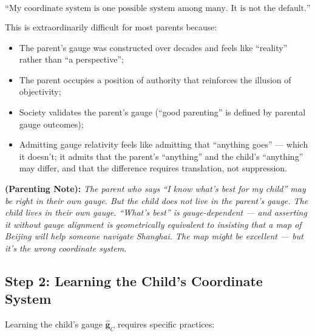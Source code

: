 \documentclass[11pt,a4paper]{article}
\newcommand{\parentnote}[1]{%
  \medskip\noindent
  \textbf{ (Parenting Note):} \textit{#1}%
}
\begin{document}
\begin{equation}
    \text{``My coordinate system is one possible system among many. It is not the default.''}
\end{equation}

This is extraordinarily difficult for most parents because:
\begin{itemize}
    \item The parent's gauge was constructed over decades and feels like ``reality'' rather than ``a perspective'';
    \item The parent occupies a position of authority that reinforces the illusion of objectivity;
    \item Society validates the parent's gauge (``good parenting'' is defined by parental gauge outcomes);
    \item Admitting gauge relativity feels like admitting that ``anything goes'' — which it doesn't; it admits that the parent's ``anything'' and the child's ``anything'' may differ, and that the difference requires translation, not suppression.
\end{itemize}

\parentnote{The parent who says ``I know what's best for my child'' may be right in their own gauge. But the child does not live in the parent's gauge. The child lives in their own gauge. ``What's best'' is gauge-dependent — and asserting it without gauge alignment is geometrically equivalent to insisting that a map of Beijing will help someone navigate Shanghai. The map might be excellent — but it's the wrong coordinate system.}

\subsection{Step 2: Learning the Child's Coordinate System}

Learning the child's gauge $\hat{\mathbf{g}}_C$ requires specific practices:
\end{document}
